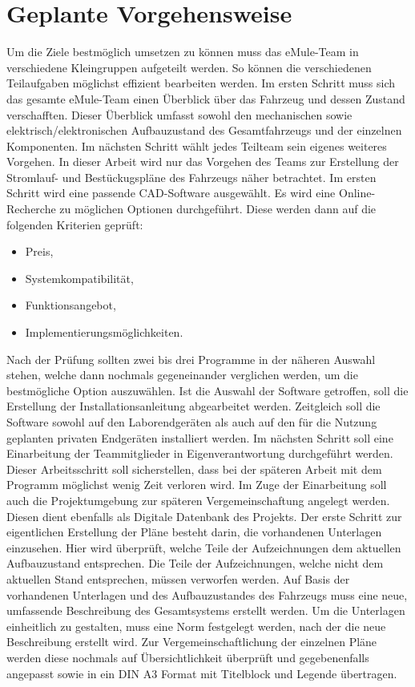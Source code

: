 \section*{Geplante Vorgehensweise}
Um die Ziele bestmöglich umsetzen zu können muss das eMule-Team in verschiedene Kleingruppen aufgeteilt werden. So können die verschiedenen Teilaufgaben möglichst effizient bearbeiten werden. Im ersten Schritt muss sich das gesamte eMule-Team einen Überblick über das Fahrzeug und dessen Zustand verschafften. Dieser Überblick umfasst sowohl den mechanischen sowie elektrisch/elektronischen Aufbauzustand des Gesamtfahrzeugs und der einzelnen Komponenten. Im nächsten Schritt wählt jedes Teilteam sein eigenes weiteres Vorgehen. In dieser Arbeit wird nur das Vorgehen des Teams zur \glqq Erstellung der Stromlauf- und Bestückugspläne des Fahrzeugs\grqq{} näher betrachtet. \newline
Im ersten Schritt wird eine passende CAD-Software ausgewählt. Es wird eine Online-Recherche zu möglichen Optionen durchgeführt. Diese werden dann auf die folgenden Kriterien geprüft:
\begin{itemize}
	\item Preis,
	\item Systemkompatibilität,
	\item Funktionsangebot,
	\item Implementierungsmöglichkeiten.
\end{itemize} Nach der Prüfung sollten zwei bis drei Programme in der näheren Auswahl stehen, welche dann nochmals gegeneinander verglichen werden, um die bestmögliche Option auszuwählen.\newline
Ist die Auswahl der Software getroffen, soll die Erstellung der Installationsanleitung abgearbeitet werden. Zeitgleich soll die Software sowohl auf den Laborendgeräten als auch auf den für die Nutzung geplanten privaten Endgeräten installiert werden. \newline
Im nächsten Schritt soll eine Einarbeitung der Teammitglieder in Eigenverantwortung durchgeführt werden. Dieser Arbeitsschritt soll sicherstellen, dass bei der späteren Arbeit mit dem Programm möglichst wenig Zeit verloren wird. Im Zuge der Einarbeitung soll auch die Projektumgebung zur späteren Vergemeinschaftung angelegt werden. Diesen dient ebenfalls als Digitale Datenbank des Projekts. \newline
Der erste Schritt zur eigentlichen Erstellung der Pläne besteht darin, die vorhandenen Unterlagen einzusehen. Hier wird überprüft, welche Teile der Aufzeichnungen dem aktuellen Aufbauzustand entsprechen. Die Teile der Aufzeichnungen, welche nicht dem aktuellen Stand entsprechen, müssen verworfen werden. Auf Basis der vorhandenen Unterlagen und des Aufbauzustandes des Fahrzeugs muss eine neue, umfassende Beschreibung des Gesamtsystems erstellt werden. Um die Unterlagen einheitlich zu gestalten, muss eine Norm festgelegt werden, nach der die neue Beschreibung erstellt wird.\newline
Zur Vergemeinschaftlichung der einzelnen Pläne werden diese nochmals auf Übersichtlichkeit überprüft und gegebenenfalls angepasst sowie in ein DIN A3 Format mit Titelblock und Legende übertragen.








	
